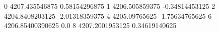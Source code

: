 0 4207.435546875 0.58154296875
1 4206.505859375 -0.34814453125
2 4204.8408203125 -2.01318359375
4 4205.09765625 -1.75634765625
6 4206.85400390625 0.0
8 4207.2001953125 0.34619140625
